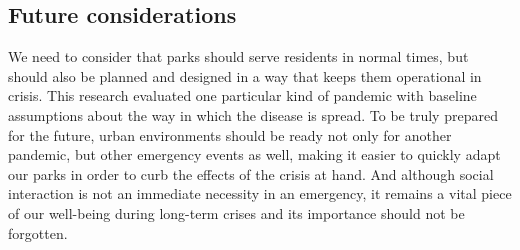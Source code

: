 \begin{multicols}{2}
\section{Future considerations}
We need to consider that parks should serve residents in normal times, but should also be planned and designed in a way that keeps them operational in crisis. This research evaluated one particular kind of pandemic with baseline assumptions about the way in which the disease is spread. To be truly prepared for the future, urban environments should be ready not only for another pandemic, but other emergency events as well, making it easier to quickly adapt our parks in order to curb the effects of the crisis at hand. And although social interaction is not an immediate necessity in an emergency, it remains a vital piece of our well-being during long-term crises and its importance should not be forgotten.

\end{multicols}
